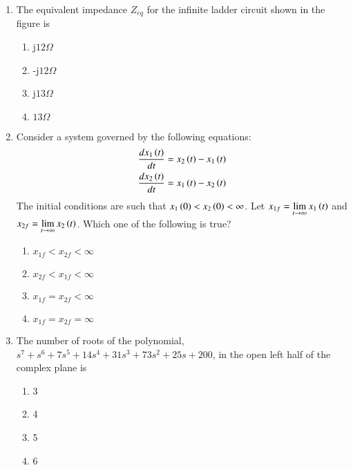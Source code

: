 \documentclass[journal]{IEEEtran}
\begin{document}
\begin{enumerate}
\begin{enumerate}
\begin{figure}[!ht]
    \label{fig:c}
    \end{figure}
    \item \begin{figure}[!ht]
    \label{fig:d}
    \end{figure}
\end{enumerate}
\item The equivalent impedance $Z_{eq}$ for the infinite ladder circuit shown in the figure is 
\begin{figure}[!ht]
\centering
    \label{fig:infinite ladder}
    \end{figure}
\begin{enumerate}
    \item j$12\Omega$
    \item -j$12\Omega$
    \item j$13\Omega$
    \item $13\Omega$
\end{enumerate}
\item Consider a system governed by the following equations:
\begin{align}
    \frac{dx_1\left(t\right)}{dt} &= x_2\left(t\right) - x_1\left(t\right) \\
    \frac{dx_2\left(t\right)}{dt} &= x_1\left(t\right) - x_2\left(t\right)
\end{align}
The initial conditions are such that $x_1\left(0\right) < x_2\left(0\right) < \infty$. Let $x_{1f} = \lim\limits_{t \to \infty} x_1\left(t\right)$ and $x_{2f} = \lim\limits_{t \to \infty} x_2\left(t\right)$. Which one of the following is true?
\begin{enumerate}
    \item $x_{1f} < x_{2f} < \infty$
    \item $x_{2f} < x_{1f} < \infty$
    \item $x_{1f} = x_{2f} < \infty$
    \item $x_{1f} = x_{2f} = \infty$
\end{enumerate}
\item The number of roots of the polynomial, $s^7 + s^6 + 7s^5 + 14s^4 + 31s^3 + 73s^2 + 25s + 200$, in the open left half of the complex plane is
\begin{enumerate}
    \item 3
    \item 4
    \item 5
    \item 6

\end{enumerate}
\end{enumerate}
\end{document}
